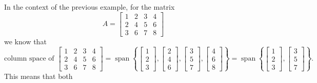 In the context of the previous example, for the matrix
\begin{equation*}
A = \begin{bmatrix}
1 & 2 & 3 & 4 \\
2 & 4 & 5 & 6 \\
3 & 6 & 7 & 8
\end{bmatrix} 
\end{equation*}
we know that 
\begin{equation*}
\text{column space of }
\begin{bmatrix}
1 & 2 & 3 & 4 \\
2 & 4 & 5 & 6 \\
3 & 6 & 7 & 8
\end{bmatrix}
=
\operatorname{span}
\left\{
\begin{bmatrix}
1 \\
2 \\
3 
\end{bmatrix}
,
\begin{bmatrix}
2 \\
4 \\
6
\end{bmatrix}
,
\begin{bmatrix}
3 \\
5 \\
7
\end{bmatrix}
,
\begin{bmatrix}
4 \\
6 \\
8
\end{bmatrix}
\right\}
=
\operatorname{span}
\left\{
\begin{bmatrix}
1 \\
2 \\
3
\end{bmatrix}
,
\begin{bmatrix}
3 \\
5 \\
7
\end{bmatrix}
\right\} .
\end{equation*}
This means that both 
